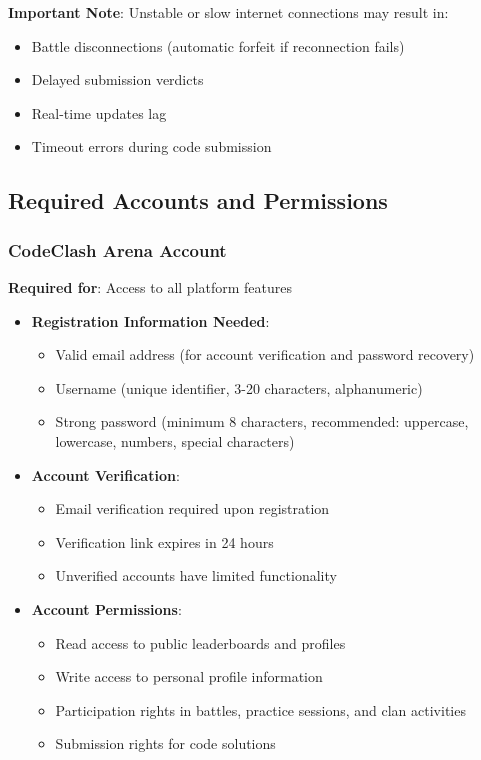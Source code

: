 \documentclass[12pt,a4paper]{article}
\begin{document}
\textbf{Important Note}: Unstable or slow internet connections may result in:
\begin{itemize}[leftmargin=*]
\item Battle disconnections (automatic forfeit if reconnection fails)
\item Delayed submission verdicts
\item Real-time updates lag
\item Timeout errors during code submission
\end{itemize}

\subsection{Required Accounts and Permissions}

\subsubsection{CodeClash Arena Account}

\textbf{Required for}: Access to all platform features

\begin{itemize}[leftmargin=*]
\item \textbf{Registration Information Needed}:
  \begin{itemize}
    \item Valid email address (for account verification and password recovery)
    \item Username (unique identifier, 3-20 characters, alphanumeric)
    \item Strong password (minimum 8 characters, recommended: uppercase, lowercase, numbers, special characters)
  \end{itemize}
\item \textbf{Account Verification}:
  \begin{itemize}
    \item Email verification required upon registration
    \item Verification link expires in 24 hours
    \item Unverified accounts have limited functionality
  \end{itemize}
\item \textbf{Account Permissions}:
  \begin{itemize}
    \item Read access to public leaderboards and profiles
    \item Write access to personal profile information
    \item Participation rights in battles, practice sessions, and clan activities
    \item Submission rights for code solutions
  \end{itemize}
\end{itemize}
\end{document}

